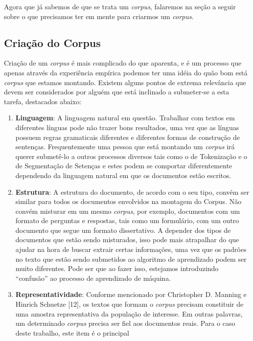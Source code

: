 \documentclass[11pt]{report}
\newcommand{\quotes}[1]{``#1''}
\begin{document}
Agora que já sabemos de que se trata um \textit{corpus}, falaremos na seção a seguir sobre o que precisamos ter em mente para criarmos um \textit{corpus}.

\subsection{Criação do Corpus}

\indent\indent Criação de um \textit{corpus} é mais complicado do que aparenta, e é um processo que apenas através da experiência empírica podemos ter uma idéia do
quão bom está \textit{corpus} que estamos montando. Existem alguns pontos de extrema relevância que devem ser considerados por alguém que está inclinado a submeter-se a esta
tarefa, destacados abaixo:

\begin{enumerate}[label=\textbf{\arabic*.}]
  \item \textbf{Linguagem}: A linguagem natural em questão. Trabalhar com textos em diferentes línguas pode não trazer bons resultados, uma vez que as línguas possuem regras
  gramaticais diferentes e diferentes formas de construção de sentenças. Frequentemente uma pessoa que está montando um \textit{corpus} irá querer submetê-lo a outros processos diversos
  tais como o de Tokenização e o de Segmentação de Setenças e estes podem se comportar diferentemente dependendo da linguagem natural em que os documentos estão escritos.
  \item \textbf{Estrutura}: A estrutura do documento, de acordo com o seu tipo, convém ser similar para todos os documentos envolvidos na montagem do Corpus. Não convém
  misturar em um mesmo \textit{corpus}, por exemplo, documentos com um formato de perguntas e respostas, tais como um formulário, com um outro documento que segue um formato dissertativo.
  A depender dos tipos de documentos que estão sendo misturados, isso pode mais atrapalhar do que ajudar na hora de buscar extrair certas informações, uma vez que os padrões
  no texto que estão sendo submetidos ao algoritmo de aprendizado podem ser muito diferentes. Pode ser que ao fazer isso, estejamos introduzindo \quotes{confusão} ao processo
  de aprendizado de máquina.
  \item \textbf{Representatividade}: Conforme mencionado por Christopher D. Manning e Hinrich Schuetze [12], os textos que formam o \textit{corpus} precisam constituir de uma amostra
  representativa da população de interesse. Em outras palavras, um determinado \textit{corpus} precisa ser fiel aos documentos reais. Para o caso deste trabalho, este item é o principal

\end{enumerate}
\end{document}
